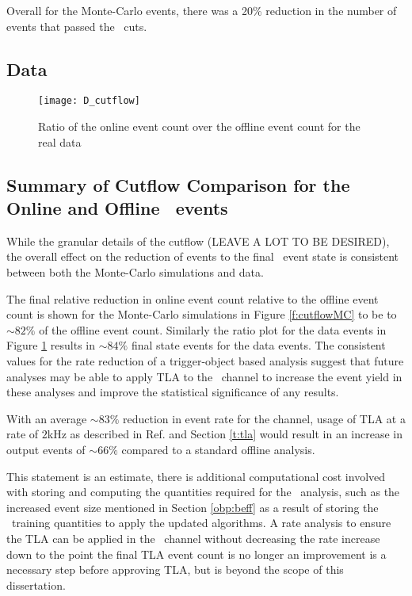 	Overall for the Monte-Carlo events, there was a 20\% reduction in the number of events that passed the \VBFHBB\, cuts.










	\subsection{Data}
		\begin{figure}[h]
			\centering
			\texttt{[image: D\_cutflow]}
			\caption[\VBFHBB\ Cutflow ratio for data]{Ratio of the online event count over the offline event count for the real data}
			\label{f:cutflowD}
		\end{figure}


	\subsection{Summary of Cutflow Comparison for the Online and Offline \VBFHBB\ events}

	While the granular details of the cutflow (LEAVE A LOT TO BE DESIRED), the overall effect on the reduction of events to the final \VBFHBB\ event state is consistent between both the Monte-Carlo simulations and data.

	The final relative reduction in online event count relative to the offline event count is shown for the Monte-Carlo simulations in Figure \ref{f:cutflowMC} to be to $\sim82\%$ of the offline event count. Similarly the ratio plot for the data events in Figure \ref{f:cutflowD} results in $\sim84\%$ final state events for the data events. The consistent values for the rate reduction of a trigger-object based analysis suggest that future analyses may be able to apply TLA to the \VBFHBB\ channel to increase the event yield in these analyses and improve the statistical significance of any results.

	With an average $\sim83\%$ reduction in event rate for the channel, usage of TLA at a rate of $2$kHz as described in Ref. \cite{TLA} and Section \ref{t:tla} would result in an increase in output events of $\sim66\%$ compared to a standard offline analysis.

	This statement is an estimate, there is additional computational cost involved with storing and computing the quantities required for the \VBFHBB\ analysis, such as the increased event size mentioned in Section \ref{obp:beff} as a result of storing the \btag\ training quantities to apply the updated algorithms. A rate analysis to ensure the TLA can be applied in the \VBFHBB\ channel without decreasing the rate increase down to the point the final TLA event count is no longer an improvement is a necessary step before approving TLA, but is beyond the scope of this dissertation.


